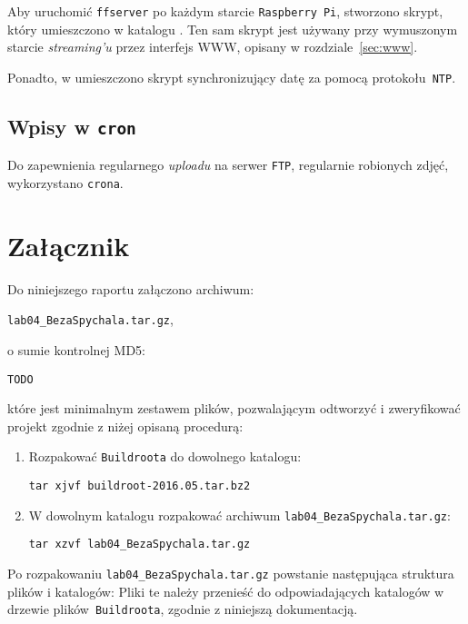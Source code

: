 \documentclass{article}
\newcommand{\labnumber}{4}
\newcommand{\buildrootver}{2016.05}
\begin{document}
Aby uruchomić \texttt{ffserver} po każdym starcie \texttt{Raspberry~Pi}, stworzono skrypt, który umieszczono w katalogu . Ten sam skrypt jest używany przy wymuszonym starcie \emph{streaming'u} przez interfejs WWW, opisany w rozdziale~\ref{sec:www}.

Ponadto, w  umieszczono skrypt synchronizujący datę za pomocą protokołu~\texttt{NTP}.


\subsection{Wpisy w \texttt{cron}}

Do zapewnienia regularnego \emph{uploadu} na serwer \texttt{FTP}, regularnie robionych zdjęć, wykorzystano \texttt{crona}.


\section{Załącznik}

Do niniejszego raportu załączono archiwum:
\begin{center}
\texttt{lab0\labnumber\_BezaSpychala.tar.gz},
\end{center}
o sumie kontrolnej MD5:
\begin{center}
\texttt{TODO}
\end{center}
które jest minimalnym zestawem plików, pozwalającym odtworzyć i zweryfikować projekt zgodnie z niżej opisaną procedurą:
\begin{enumerate}
\item Rozpakować \texttt{Buildroota} do dowolnego katalogu:
\begin{center}
\texttt{tar xjvf buildroot-\buildrootver.tar.bz2}
\end{center}

\item W dowolnym katalogu rozpakować archiwum \texttt{lab0\labnumber\_BezaSpychala.tar.gz}:
\begin{center}
\texttt{tar xzvf lab0\labnumber\_BezaSpychala.tar.gz}
\end{center}
\end{enumerate}

Po rozpakowaniu \texttt{lab0\labnumber\_BezaSpychala.tar.gz} powstanie następująca struktura plików i katalogów:
Pliki te należy przenieść do odpowiadających katalogów w drzewie plików~\texttt{Buildroota}, zgodnie z niniejszą dokumentacją.


\newpage


\end{document}
